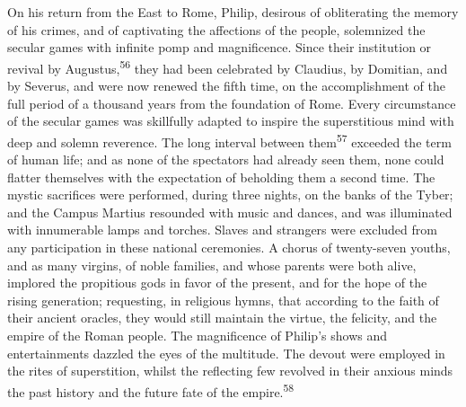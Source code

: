 On his return from the East to Rome, Philip, desirous of
obliterating the memory of his crimes, and of captivating the
affections of the people, solemnized the secular games with
infinite pomp and magnificence. Since their institution or
revival by Augustus,\textsuperscript{56} they had been celebrated by Claudius, by
Domitian, and by Severus, and were now renewed the fifth time, on
the accomplishment of the full period of a thousand years from
the foundation of Rome. Every circumstance of the secular games
was skillfully adapted to inspire the superstitious mind with
deep and solemn reverence. The long interval between them\textsuperscript{57}
exceeded the term of human life; and as none of the spectators
had already seen them, none could flatter themselves with the
expectation of beholding them a second time. The mystic
sacrifices were performed, during three nights, on the banks of
the Tyber; and the Campus Martius resounded with music and
dances, and was illuminated with innumerable lamps and torches.
Slaves and strangers were excluded from any participation in
these national ceremonies. A chorus of twenty-seven youths, and
as many virgins, of noble families, and whose parents were both
alive, implored the propitious gods in favor of the present, and
for the hope of the rising generation; requesting, in religious
hymns, that according to the faith of their ancient oracles, they
would still maintain the virtue, the felicity, and the empire of
the Roman people. The magnificence of Philip’s shows and
entertainments dazzled the eyes of the multitude. The devout were
employed in the rites of superstition, whilst the reflecting few
revolved in their anxious minds the past history and the future
fate of the empire.\textsuperscript{58}




